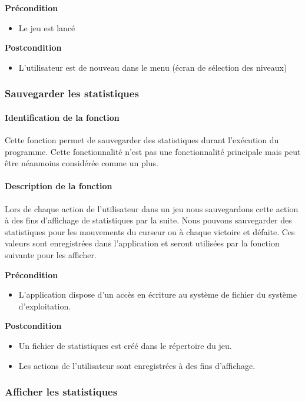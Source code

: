 \documentclass{polytech/polytech}
\begin{document}
\textbf{Précondition}
\begin{itemize}
\item Le jeu est lancé
\end{itemize}

\textbf{Postcondition}
\begin{itemize}
\item L'utilisateur est de nouveau dans le menu (écran de sélection des niveaux)
\end{itemize}

\subsubsection{Sauvegarder les statistiques}
\paragraph{Identification de la fonction}
Cette fonction permet de sauvegarder des statistiques durant l'exécution du programme. Cette fonctionnalité n'est pas une fonctionnalité principale mais peut être néanmoins considérée comme un plus. 
\paragraph{Description de la fonction}
Lors de chaque action de l'utilisateur dans un jeu nous sauvegardons cette action à des fins d'affichage de statistiques par la suite. Nous pouvons sauvegarder des statistiques pour  les mouvements du curseur ou à chaque victoire et défaite. Ces valeurs sont enregistrées dans l'application et seront utilisées par la fonction suivante pour les afficher.

\textbf{Précondition}
\begin{itemize}
\item L'application dispose d'un accès en écriture au système de fichier du système d'exploitation.
\end{itemize}

\textbf{Postcondition}
\begin{itemize}
\item Un fichier de statistiques est créé dans le répertoire du jeu.
\item Les actions de l'utilisateur sont enregistrées à des fins d'affichage.
\end{itemize}

\subsubsection{Afficher les statistiques}
\end{document}
